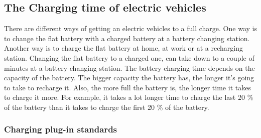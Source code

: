\subsection{The Charging time of electric vehicles}
  
There are different ways of getting an electric vehicles to a full charge. One way is to change the
flat battery with a charged battery at a battery changing station.  Another way is to charge the flat 
battery at home, at work or at a recharging station. Changing the flat battery to a charged one, can 
take down to a couple of minutes at a battery changing station. The battery charging time depends on
the capacity of the battery. The bigger capacity the battery has, the longer it's going to take to 
recharge it. Also, the more full the battery is, the longer time it takes to charge it more. For example,
it takes a lot longer time to charge the last 20 \% of the battery than it takes to charge the first
20 \% of the battery.

\subsubsection{Charging plug-in standards}

